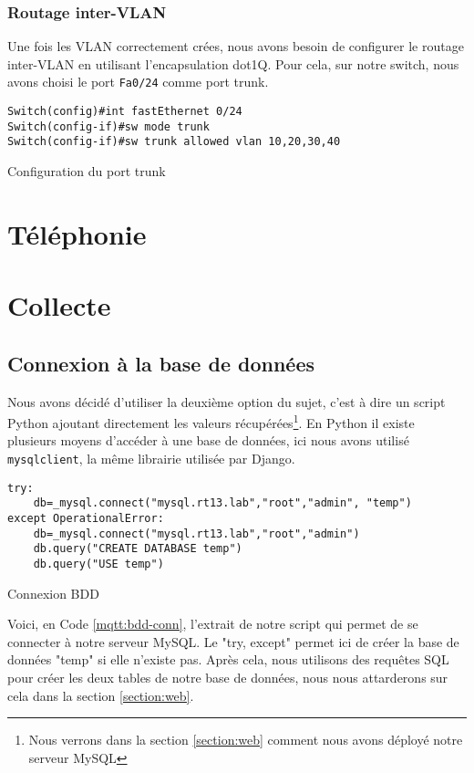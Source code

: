 \documentclass{article}
\begin{document}
\subsubsection{Routage inter-VLAN}
Une fois les VLAN correctement crées, nous avons besoin de configurer le routage inter-VLAN en utilisant l'encapsulation dot1Q.
Pour cela, sur notre switch, nous avons choisi le port \verb|Fa0/24| comme port trunk.
\begin{listing}[H]
    \begin{verbatim}
Switch(config)#int fastEthernet 0/24
Switch(config-if)#sw mode trunk 
Switch(config-if)#sw trunk allowed vlan 10,20,30,40
    \end{verbatim}
    \caption{Configuration du port trunk}
    \label{reseau:switch:trunk}
\end{listing}

\newpage
\section{Téléphonie}

\newpage
\section{Collecte}
    \subsection{Connexion à la base de données}
    Nous avons décidé d'utiliser la deuxième option du sujet, c'est à dire un script Python ajoutant directement les valeurs récupérées\footnote{Nous verrons dans la section \ref{section:web} comment nous avons déployé notre serveur MySQL}. 
    En Python il existe plusieurs moyens d'accéder à une base de données, ici nous avons utilisé \verb|mysqlclient|, la même librairie utilisée par Django.
    \begin{listing}[H]
        \begin{verbatim}
try:
    db=_mysql.connect("mysql.rt13.lab","root","admin", "temp")
except OperationalError:
    db=_mysql.connect("mysql.rt13.lab","root","admin")
    db.query("CREATE DATABASE temp")
    db.query("USE temp")
        \end{verbatim}
        \caption{Connexion BDD}
        \label{mqtt:bdd-conn}
    \end{listing}
    Voici, en Code \ref{mqtt:bdd-conn}, l'extrait de notre script qui permet de se connecter à notre serveur MySQL. Le "try, except" permet ici de créer la base de données "temp" si elle n'existe pas. Après cela, nous utilisons des requêtes SQL pour créer les deux tables de notre base de données, nous nous attarderons sur cela dans la section \ref{section:web}.
\end{document}
